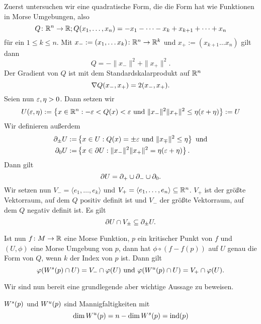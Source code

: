 \begin{definition}
    \label{notation: morse umgebung}
    Zuerst untersuchen wir eine quadratische Form, die die Form hat wie Funktionen in Morse
    Umgebungen, also
    \[ Q \colon { \mathbb R }^n \to { \mathbb R } ; Q(x_1, \dots, x_n) = - x_1 - \dots - x_k + x_{k + 1} + \dots + x_n \]
    für ein $1 \leq k \leq n$.
    Mit $x_- := (x_1, \dots x_k) \colon { \mathbb R }^n \to { \mathbb R }^k$ und $x_+ := (x_{k + 1} \dots x_n)$ gilt dann
    \[ Q = - \| x_- \|^2 + \| x_+ \|^2 . \]
    Der Gradient von $Q$ ist mit dem Standardskalarprodukt auf ${ \mathbb R }^n$
    \[ { \nabla } Q (x_-, x_+) = 2(x_-, x_+) . \]
    Seien nun $\varepsilon, \eta > 0$. Dann setzen wir
    \[ U(\varepsilon, \eta) := \left\{ x \in { \mathbb R }^n : - \varepsilon < Q(x) < \varepsilon 
    \text{ und } \| x_- \|^2 \| x_+ \|^2 \leq \eta(\varepsilon + \eta) \right\} := U \]
    Wir definieren außerdem
    \begin{align*}
        { \partial }_{\pm} U := & \left\{ x \in U: Q(x) = \pm \varepsilon \text{ und } \|x_{\mp} \|^2 \leq \eta \right\} 
            \text{ und} \\
        { \partial }_0 U := & \left\{ x \in { \partial } U: \| x_- \|^2 \| x_+ \|^2 = \eta(\varepsilon + \eta) \right\} .
    \end{align*}
    Dann gilt 
    \[ { \partial } U = { \partial }_+ \cup { \partial }_- \cup { \partial }_0 . \]
    Wir setzen nun $V_- = \langle e_1, \dots, e_k \rangle$ und 
    $V_+ = \langle e_1, \dots, e_n \rangle \subseteq { \mathbb R }^n$. $V_+$ ist der größte Vektorraum, 
    auf dem $Q$ positiv definit ist und $V_-$ der größte Vektorraum, auf dem $Q$ negativ definit ist. 
    Es gilt 
    \[ { \partial } U \cap V_{\pm} \subseteq { \partial }_{\pm} U . \]

    Ist nun $f \colon M \to { \mathbb R }$ eine Morse Funktion, $p$ ein kritischer Punkt von $f$ und $(U, \phi)$
    eine Morse Umgebung von $p$, dann hat $\phi \circ (f - f(p))$ auf $U$ genau die Form von $Q$, wenn
    $k$ der Index von $p$ ist. Dann gilt 
    \[ 
        \varphi({ W^s }(p) \cap U) = V_- \cap \varphi(U) \text{ und } 
        \varphi({ W^u }(p) \cap U) = V_+ \cap \varphi(U) .
    \]
\end{definition}

Wir sind nun bereit eine grundlegende aber wichtige Aussage zu beweisen.

\begin{prop}
    ${ W^s } (p)$ und ${ W^u } (p)$ sind Mannigfaltigkeiten mit 
    \[ \dim { W^u } (p) = n - \dim { W^s } (p) = { \operatorname{ind} } (p) \]
\end{prop}

